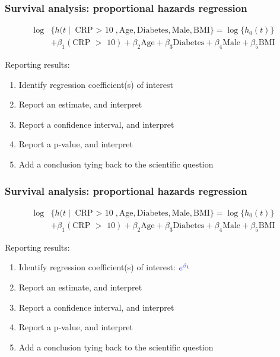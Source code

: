\documentclass[12pt, 
hyperref={colorlinks=true, linkcolor=blue, urlcolor=cyan},dvipsnames]{beamer}
\begin{document}
\begin{frame}
\frametitle{Survival analysis: proportional hazards regression}
\begin{align*}
\log & \{h(t \mid \text{CRP $>$ 10}, \text{Age}, \text{Diabetes}, \text{Male}, \text{BMI}\} =  \log\{h_0(t)\} \\
&+ \beta_1 (\text{CRP $>$ 10}) + \beta_2 \text{Age} + \beta_3 \text{Diabetes} + \beta_4 \text{Male} + \beta_5 \text{BMI}
\end{align*}

Reporting results: 
\begin{enumerate}
\item Identify regression coefficient(s) of interest
\item Report an estimate, and interpret
\item Report a confidence interval, and interpret
\item Report a p-value, and interpret
\item Add a conclusion tying back to the scientific question
\end{enumerate}
\end{frame}

\begin{frame}[noframenumbering]
\frametitle{Survival analysis: proportional hazards regression}
\begin{align*}
\log & \{h(t \mid \text{CRP $>$ 10}, \text{Age}, \text{Diabetes}, \text{Male}, \text{BMI}\} =  \log\{h_0(t)\} \\
&+ \beta_1 (\text{CRP $>$ 10}) + \beta_2 \text{Age} + \beta_3 \text{Diabetes} + \beta_4 \text{Male} + \beta_5 \text{BMI}
\end{align*}

Reporting results: 
\begin{enumerate}
\item Identify regression coefficient(s) of interest: $\textcolor{blue}{e^{\beta_1}}$
\item Report an estimate, and interpret
\item Report a confidence interval, and interpret
\item Report a p-value, and interpret
\item Add a conclusion tying back to the scientific question
\end{enumerate}
\end{frame}
\end{document}
